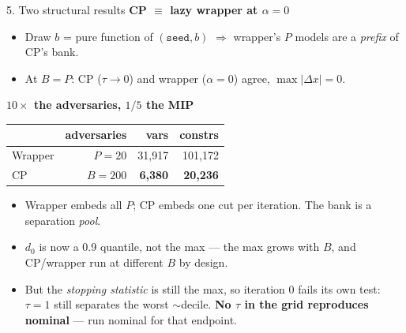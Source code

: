 \documentclass{beamer}
\begin{document}
\begin{frame}{5. Two structural results}
  \small
  \textbf{CP $\equiv$ lazy wrapper at $\alpha=0$}
  \begin{itemize}
    \item Draw $b$ = pure function of $(\texttt{seed},b)$ $\Rightarrow$ wrapper's $P$
      models are a \emph{prefix} of CP's bank.
    \item At $B=P$: CP ($\tau\to0$) and wrapper ($\alpha=0$) agree,
      $\max|\Delta x| = 0$.
  \end{itemize}
  \medskip
  \textbf{$10\times$ the adversaries, $1/5$ the MIP}
  \begin{center}\small
  \begin{tabular}{@{}lrrr@{}}
    \toprule
    & adversaries & vars & constrs \\
    \midrule
    Wrapper & $P=20$  & 31{,}917 & 101{,}172 \\
    CP      & $B=200$ & \textbf{6{,}380} & \textbf{20{,}236} \\
    \bottomrule
  \end{tabular}
  \end{center}
  \medskip
  \begin{itemize}
    \item Wrapper embeds all $P$; CP embeds one cut per iteration. The bank is a
      separation \emph{pool}.
    \item $d_0$ is now a 0.9 quantile, not the max --- the max grows with $B$, and
      CP/wrapper run at different $B$ by design.
    \item But the \emph{stopping statistic} is still the max, so iteration 0 fails
      its own test: $\tau=1$ still separates the worst ${\sim}$decile.
      \textbf{No $\tau$ in the grid reproduces nominal} --- run nominal for that
      endpoint.
  \end{itemize}
\end{frame}
\end{document}
